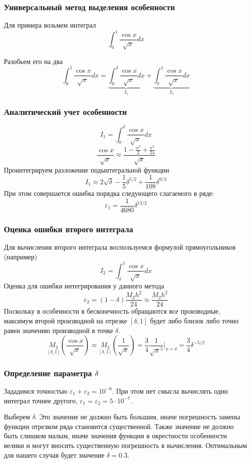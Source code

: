 \documentclass[aspectratio=169,unicode]{beamer}
\begin{document}
\begin{frame}
\frametitle{Универсальный метод выделения особенности}
	Для примера возьмем интеграл
	\[
	\int_0^1 \frac{\cos x}{\sqrt{x}} dx
	\]
	\pause

	Разобьем его на два
	\[
	\int_0^1 \frac{\cos x}{\sqrt{x}} dx = \underbrace{\int_0^\delta \frac{\cos x}{\sqrt{x}} dx}_{I_1} +
	\underbrace{\int_\delta^1 \frac{\cos x}{\sqrt{x}} dx}_{I_2}
	\]
\end{frame}

\begin{frame}
\frametitle{Аналитический учет особенности}
	\[
	I_1 = \int_0^\delta \frac{\cos x}{\sqrt{x}} dx
	\]
	\[
	\frac{\cos x}{\sqrt{x}} \approx \frac{1 - \frac{x^2}{2} + \frac{x^4}{24}}{\sqrt{x}}
	\]
	Проинтегрируем разложение подынтегральной функции
	\[
	I_1 \approx 2\sqrt{\delta} - \frac{1}{5}\delta^{5/2} +
\frac{1}{108}\delta^{9/2}
	\]
	При этом совершается ошибка порядка следующего слагаемого в ряде:
	\[
	\varepsilon_1 = \frac{1}{4680}\delta^{13/2}
	\]
\end{frame}

\begin{frame}
\frametitle{Оценка ошибки второго интеграла}
	Для вычисления второго интеграла воспользуемся формулой прямоугольников (например)
	\[
	I_2 = \int_\delta^1 \frac{\cos x}{\sqrt{x}} dx
	\]
	Оценка для ошибки интегрирования у данного метода
	\[
	\varepsilon_2 = (1-\delta)\frac{M_2 h^2}{24} \approx \frac{M_2 h^2}{24}
	\]
	Поскольку в особенности в бесконечность обращаются все производные, максимум
	второй производной на отрезке $[\delta, 1]$ будет либо близок либо точно равен
	значению производной в точке $\delta$.
	\[
	\underset{[\delta, 1]}{M_2}\left(\frac{\cos x}{\sqrt{x}}\right) \approx
	\underset{[\delta, 1]}{M_2}\left(\frac{1}{\sqrt{x}}\right)
	= \frac{3}{4}\frac{1}{\sqrt{x}^5}\Big|_{x = \delta}
	= \frac{3}{4}\delta^{-5/2}
	\]
\end{frame}

\begin{frame}
\frametitle{Определение параметра $\delta$}
	Зададимся точностью $\varepsilon_1 + \varepsilon_2 = 10^{-6}$. При этом нет смысла
	вычислять один интеграл точнее другого, $\varepsilon_1 = \varepsilon_2 = 5\cdot10^{-7}$.

	Выберем $\delta$. Это значение не должно быть большим, иначе погрешность замены
	функции отрезком ряда становится существенной. Также значение не должно быть слишком малым,
	иначе значения функции в окрестности особенности велики и могут вносить существенную погрешность в вычисления.
	Оптимальным для нашего случая будет значение $\delta = 0.3$.
\end{frame}
\end{document}
